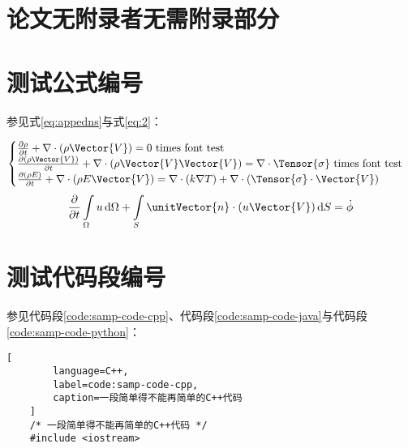 \begin{appendices}\label{sec:appendices}

	\section*{论文无附录者无需附录部分}

	\section*{测试公式编号} \label{sec:testmath}

	参见式\eqref{eq:appedns}与式\eqref{eq:2}：

	\begin{equation} \label{eq:appedns}
		\begin{cases}
			\frac{\partial \rho}{\partial t} + \nabla\cdot(\rho\Vector{V}) = 0 \ \mathrm{times\ font\ test}                                            \\
			\frac{\partial (\rho\Vector{V})}{\partial t} + \nabla\cdot(\rho\Vector{V}\Vector{V}) = \nabla\cdot\Tensor{\sigma} \ \text{times font test} \\
			\frac{\partial (\rho E)}{\partial t} + \nabla\cdot(\rho E\Vector{V}) = \nabla\cdot(k\nabla T) + \nabla\cdot(\Tensor{\sigma}\cdot\Vector{V})
		\end{cases}
	\end{equation}
	\begin{equation} \label{eq:2}
		\frac{\partial }{\partial t}\int\limits_{\Omega} u \, \mathrm{d}\Omega + \int\limits_{S} \unitVector{n}\cdot(u\Vector{V}) \, \mathrm{d}S = \dot{\phi}
	\end{equation}

	\section*{测试代码段编号} \label{sec:testlistings}

	参见代码段\ref{code:samp-code-cpp}、代码段\ref{code:samp-code-java}与代码段
	\ref{code:samp-code-python}：

	\begin{lstlisting}[
        language=C++,
        label=code:samp-code-cpp,
        caption=一段简单得不能再简单的C++代码
    ]
    /* 一段简单得不能再简单的C++代码 */
    #include <iostream>


\end{lstlisting}
\end{appendices}
